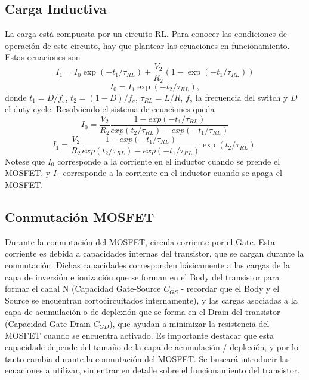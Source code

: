 \documentclass[e4_tp1_main.tex]{subfiles}
\begin{document}
\subsection{Carga Inductiva}
La carga está compuesta por un circuito RL. Para conocer las condiciones de operación de este circuito, hay que plantear las ecuaciones en funcionamiento. Estas ecuaciones son
\begin{equation}
I_1 = I_0\exp(-t_1/\tau_{RL})+\frac{V_2}{R_2}(1-\exp(-t_1/\tau_{RL}))
\end{equation}
\begin{equation}
I_0 = I_1\exp(-t_2/\tau_{RL}),
\end{equation}
donde $t_1 = D/f_s$, $t_2 = (1-D)/f_s$, $\tau_{RL}=L/R$, $f_s$ la frecuencia del switch y $D$ el duty cycle. Resolviendo el sistema de ecuaciones queda
\begin{equation}
I_0 = \frac{V_2}{R_2}\frac{1-exp(-t_1/\tau_{RL})}{exp(t_2/\tau_{RL})-exp(-t_1/\tau_{RL})}
\end{equation}
\begin{equation}
I_1 = \frac{V_2}{R_2}\frac{1-exp(-t_1/\tau_{RL})}{exp(t_2/\tau_{RL})-exp(-t_1/\tau_{RL})}\exp(t_2/\tau_{RL}).
\end{equation}
Notese que $I_0$ corresponde a la corriente en el inductor cuando se prende el MOSFET, y $I_1$ corresponde a la corriente en el inductor cuando se apaga el MOSFET.

\subsection{Conmutación MOSFET}

Durante la conmutación del MOSFET, circula corriente por el Gate. Esta corriente es debida a capacidades internas del transistor, que se cargan durante la conmutación. Dichas capacidades corresponden básicamente a las cargas de la capa de inversión e ionización que se forman en el Body del transistor para formar el canal N (Capacidad Gate-Source $C_{GS}$ - recordar que el Body y el Source se encuentran cortocircuitados internamente), y las cargas asociadas a la capa de acumulación o de deplexión que se forma en el Drain del transistor (Capacidad Gate-Drain $C_{GD}$), que ayudan a minimizar la resistencia del MOSFET cuando se encuentra activado. Es importante destacar que esta capacidade depende del tamaño de la capa de acumulación / deplexión, y por lo tanto cambia durante la conmutación del MOSFET. Se buscará introducir las ecuaciones a utilizar, sin entrar en detalle sobre el funcionamiento del transistor.
\end{document}
